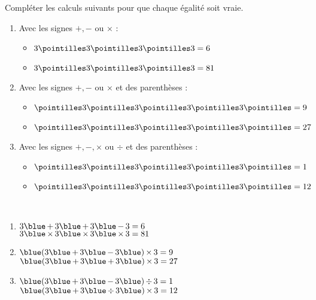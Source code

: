 \begin{exercice}%
   Compléter les calculs suivants pour que chaque égalité soit vraie.
   \begin{enumerate}
      \item Avec les signes $+, -$ ou $\times$ : \bigskip
      \begin{itemize}
         \item $3 \pointilles 3 \pointilles 3 \pointilles 3 = 6$ \bigskip
         \item $3 \pointilles 3 \pointilles 3 \pointilles 3 = 81$ \medskip
      \end{itemize}
      \item Avec les signes $+, -$ ou $\times$ et des parenthèses : \bigskip
      \begin{itemize}
         \item $\pointilles 3 \pointilles 3 \pointilles 3 \pointilles 3 \pointilles = 9$ \bigskip
         \item $\pointilles 3 \pointilles 3 \pointilles 3 \pointilles 3 \pointilles = 27$ \medskip
      \end{itemize}
      \item Avec les signes $+, -,\times$ ou $\div$ et des parenthèses : \bigskip
      \begin{itemize}
         \item $\pointilles 3 \pointilles 3 \pointilles 3 \pointilles 3 \pointilles = 1$ \bigskip
         \item $\pointilles 3 \pointilles 3 \pointilles 3 \pointilles 3 \pointilles = 12$
      \end{itemize}
   \end{enumerate}
\end{exercice}

\begin{corrige}
   \ \\ [-5mm]
   \begin{enumerate}
      \item $3 {\blue \,+\,} 3 {\blue \,+\,} 3 {\blue \,-\,} 3 = 6$ \\
         $3 {\blue \,\times\,} 3  {\blue \,\times\,} 3  {\blue \,\times\,} 3 = 81$ \smallskip
      \item ${\blue (} 3 {\blue \,+\,} 3 {\blue \,-\,} 3 {\blue )\,\times\,} 3 = 9$ \\
         ${\blue (} 3 {\blue \,+\,} 3 {\blue \,+\,} 3 {\blue )\,\times\,} 3 = 27$ \smallskip
      \item ${\blue (} 3 {\blue \,+\,} 3 {\blue \,-\,} 3 {\blue )\,\div\,} 3 = 1$ \\
         ${\blue (} 3 {\blue \,+\,} 3 {\blue \,\div\,} 3 {\blue )\,\times\,} 3 = 12$
   \end{enumerate}
\end{corrige}